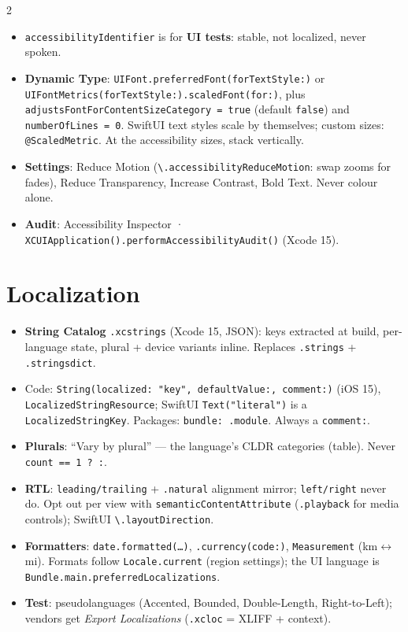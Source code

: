 \documentclass[8pt]{extarticle}
\begin{document}
\begin{multicols}{2}
\begin{itemize}
  \item \texttt{accessibilityIdentifier} is for \textbf{UI tests}: stable,
        not localized, never spoken.
  \item \textbf{Dynamic Type}: \texttt{UIFont.preferredFont(forTextStyle:)}
        or \texttt{UIFontMetrics(forTextStyle:)}\allowbreak\texttt{.scaledFont(for:)},
        plus \texttt{adjustsFontForContentSizeCategory = true} (default
        \texttt{false}) and \texttt{numberOfLines = 0}. SwiftUI text styles
        scale by themselves; custom sizes: \texttt{@ScaledMetric}. At the
        accessibility sizes, stack vertically.
  \item \textbf{Settings}: Reduce Motion
        (\texttt{\textbackslash.accessibilityReduceMotion}: swap zooms for
        fades), Reduce Transparency, Increase Contrast, Bold Text. Never
        colour alone.
  \item \textbf{Audit}: Accessibility Inspector ·
        \texttt{XCUIApplication().performAccessibilityAudit()} (Xcode 15).
\end{itemize}

\section{Localization}
\begin{itemize}
  \item \textbf{String Catalog} \texttt{.xcstrings} (Xcode 15, JSON): keys
        extracted at build, per-language state, plural + device variants
        inline. Replaces \texttt{.strings} + \texttt{.stringsdict}.
  \item Code: \texttt{String(localized: "key", defaultValue:, comment:)}
        (iOS 15), \texttt{LocalizedStringResource}; SwiftUI
        \texttt{Text("literal")} is a \texttt{LocalizedStringKey}.
        Packages: \texttt{bundle: .module}. Always a \texttt{comment:}.
  \item \textbf{Plurals}: ``Vary by plural'' — the language's CLDR
        categories (table). Never \texttt{count == 1 ? :}.
  \item \textbf{RTL}: \texttt{leading/trailing} + \texttt{.natural}
        alignment mirror; \texttt{left/right} never do. Opt out per view with
        \texttt{semanticContentAttribute} (\texttt{.playback} for media
        controls); SwiftUI \texttt{\textbackslash.layoutDirection}.
  \item \textbf{Formatters}: \texttt{date.formatted(\ldots)},
        \texttt{.currency(code:)}, \texttt{Measurement} (km$\leftrightarrow$mi).
        Formats follow \texttt{Locale.current} (region settings); the UI
        language is \texttt{Bundle.main.preferredLocalizations}.
  \item \textbf{Test}: pseudolanguages (Accented, Bounded, Double-Length,
        Right-to-Left); vendors get \emph{Export Localizations}
        (\texttt{.xcloc} = XLIFF + context).
\end{itemize}


\end{multicols}
\end{document}
